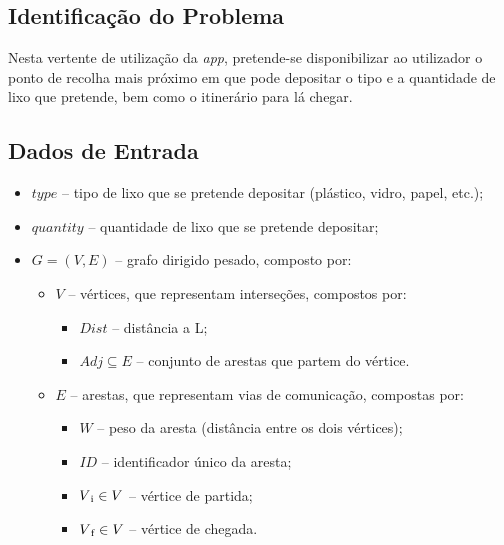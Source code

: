 \documentclass[article, a4paper, 12pt, oneside]{memoir}
\begin{document}
\subsection{Identificação do Problema}

Nesta vertente de utilização da \textit{app}, pretende-se disponibilizar ao utilizador o ponto de recolha mais próximo em que pode depositar o tipo e a quantidade de lixo que pretende, bem como o itinerário para lá chegar.

\subsection{Dados de Entrada}

\begin{itemize} %

\item $type$ – tipo de lixo que se pretende depositar (plástico, vidro, papel, etc.);
\item $quantity$ – quantidade de lixo que se pretende depositar;
\item $G = (V, E)$ – grafo dirigido pesado, composto por:

	\begin{itemize} %

	\item $V$ – vértices, que representam interseções, compostos por:

		\begin{itemize} %
		\item $Dist$ – distância a L;
		\item $Adj \subseteq E$ – conjunto de arestas que partem do vértice.
		\end{itemize} %

	\end{itemize} %

	\begin{itemize} %

	\item $E$ – arestas, que representam vias de comunicação, compostas por:

		\begin{itemize} %
		\item $W$ – peso da aresta (distância entre os dois vértices);
		\item $ID$ – identificador único da aresta;
		\item $V\textsubscript{i} \in V$ – vértice de partida;
		\item $V\textsubscript{f} \in V$ – vértice de chegada.
		\end{itemize} %


\end{itemize}
\end{itemize}
\end{document}
